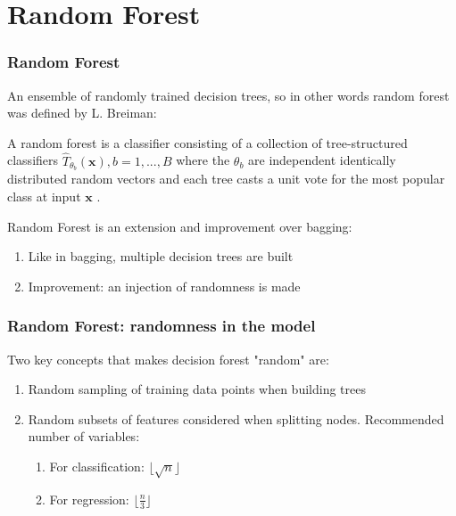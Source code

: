 \section{Random Forest}

\begin{frame}
\frametitle{Random Forest}

An ensemble of randomly trained decision trees, so in other words 
random forest was defined by L. Breiman:
\vspace{1ex}

\begin{theorem}
	A random forest is a classifier consisting of a collection of tree-structured classifiers ${\hat{T}_{\theta_{b}}(\textbf{x})}, b = 1,...,B$ where the $\theta_{b}$ are independent identically
	distributed random vectors and each tree casts a unit vote for the most popular class at input $\textbf{x}$ .
\end{theorem}
\vspace{4ex}

Random Forest is an extension and improvement over bagging:
\begin{enumerate}
\item Like in bagging, multiple decision trees are built
\item Improvement: an injection of randomness is made
\end{enumerate}

\end{frame}


\begin{frame}
\frametitle{Random Forest: randomness in the model}

Two key concepts that makes decision forest "random" are:
\begin{enumerate}
	\item Random sampling of training data points when building trees
	\item Random subsets of features considered when splitting nodes. Recommended number of variables:
	\begin{enumerate}[a]
	    \item For classification:  $\lfloor{\sqrt{n}} \rfloor$
	    \item For regression: $\lfloor \frac{n}{3} \rfloor$
	\end{enumerate}
\end{enumerate}


\end{frame}

